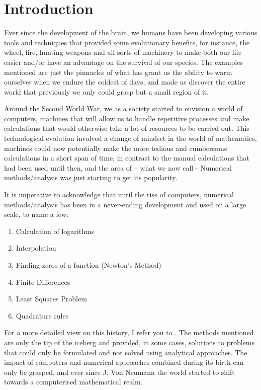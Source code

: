 \chapter{Introduction}

Ever since the development of the brain, we humans have been developing various tools and techniques that provided some evolutionary benefits, for instance, the wheel, fire, hunting weapons and all sorts of machinery to make both our life easier and/or have an advantage on the survival of our species. The examples mentioned are just the pinnacles of what has grant us the ability to warm ourselves when we endure the coldest of days, and made us discover the entire world that previously we only could grasp but a small region of it.

Around the Second World War, we as a society started to envision a world of computers, machines that will allow us to handle repetitive processes and make calculations that would otherwise take a lot of resources to be carried out. This technological evolution involved a change of mindset in the world of mathematics, machines could now potentially make the more tedious and cumbersome calculations in a short span of time, in contrast to the manual calculations that had been used until then, and the area of – what we now call - Numerical methods/analysis was just starting to get its popularity.

It is imperative to acknowledge that until the rise of computers, numerical methods/analysis has been in a never-ending development and used on a large scale, to name a few:
\begin{enumerate}
    \item Calculation of logarithms
    \item Interpolation
    \item Finding zeros of a function (Newton's Method)
    \item Finite Differences
    \item Least Squares Problem
    \item Quadrature rules
\end{enumerate}

For a more detailed view on this history, I refer you to \cite{goldstine2012history}. The methods mentioned are only the tip of the iceberg and provided, in some cases, solutions to problems that could only be formulated and not solved using analytical approaches. 
The impact of computers and numerical approaches combined during its birth can only be grasped, and ever since J. Von Neumann the world started to shift towards a computerised mathematical realm. 

